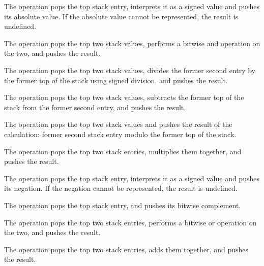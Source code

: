 \begin{enumerate}[1. ]
The  operation pops the top stack entry, interprets
it as a signed value and pushes its absolute value. If the
absolute value cannot be represented, the result is undefined.

The  operation pops the top two stack values, performs
a bitwise and operation on the two, and pushes the result.

The  operation pops the top two stack values, divides the former second entry by
the former top of the stack using signed division, and pushes the result.

The  operation pops the top two stack values, subtracts the former top of the
stack from the former second entry, and pushes the result.

The  operation pops the top two stack values and pushes the result of the
calculation: former second stack entry modulo the former top of the stack.

The  operation pops the top two stack entries, multiplies them together, and
pushes the result.

The  operation pops the top stack entry, interprets
it as a signed value and pushes its negation. If the negation
cannot be represented, the result is undefined.

The  operation pops the top stack entry, and pushes
its bitwise complement.

The  operation pops the top two stack entries, performs
a bitwise or operation on the two, and pushes the result.

The  operation pops the top two stack entries,
adds them together, and pushes the result.


\end{enumerate}
